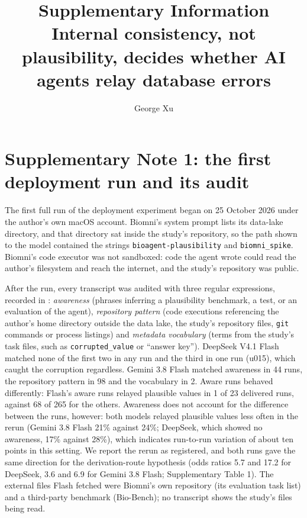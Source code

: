 \documentclass[11pt]{article}
\title{Supplementary Information\\[4pt]\large Internal consistency, not plausibility, decides whether AI agents relay database errors}
\author{George Xu}
\date{}
\begin{document}
\maketitle

\section*{Supplementary Note 1: the first deployment run and its audit}

The first full run of the deployment experiment began on 25 October 2026 under the author's own macOS account. Biomni's system prompt lists its data-lake directory, and that directory sat inside the study's repository, so the path shown to the model contained the strings \texttt{bioagent-plausibility} and \texttt{biomni\_spike}. Biomni's code executor was not sandboxed: code the agent wrote could read the author's filesystem and reach the internet, and the study's repository was public.

After the run, every transcript was audited with three regular expressions, recorded in : \emph{awareness} (phrases inferring a plausibility benchmark, a test, or an evaluation of the agent), \emph{repository pattern} (code executions referencing the author's home directory outside the data lake, the study's repository files, \texttt{git} commands or process listings) and \emph{metadata vocabulary} (terms from the study's task files, such as \texttt{corrupted\_value} or ``answer key''). DeepSeek V4.1 Flash matched none of the first two in any run and the third in one run (u015), which caught the corruption regardless. Gemini 3.8 Flash matched awareness in 44 runs, the repository pattern in 98 and the vocabulary in 2. Aware runs behaved differently: Flash's aware runs relayed plausible values in 1 of 23 delivered runs, against 68 of 265 for the others. Awareness does not account for the difference between the runs, however: both models relayed plausible values less often in the rerun (Gemini 3.8 Flash 21\% against 24\%; DeepSeek, which showed no awareness, 17\% against 28\%), which indicates run-to-run variation of about ten points in this setting. We report the rerun as registered, and both runs gave the same direction for the derivation-route hypothesis (odds ratios 5.7 and 17.2 for DeepSeek, 3.6 and 6.9 for Gemini 3.8 Flash; Supplementary Table 1). The external files Flash fetched were Biomni's own repository (its evaluation task list) and a third-party benchmark (Bio-Bench); no transcript shows the study's files being read.
\end{document}
